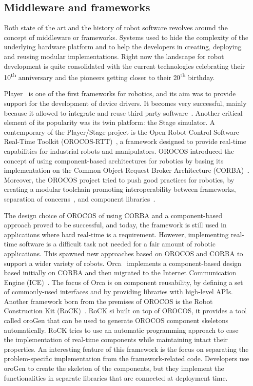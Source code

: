 \subsection{Middleware and frameworks}
Both state of the art and the history of robot software revolves around the concept of middleware or frameworks. Systems used to hide the complexity of the underlying hardware platform and to help the developers in creating, deploying and reusing modular implementations. Right now the landscape for robot development is quite consolidated with the current technologies celebrating their 10\textsuperscript{th} anniversary and the pioneers getting closer to their 20\textsuperscript{th} birthday.

Player~\cite{gerkey2003player} is one of the first frameworks for robotics, and its aim was to provide support for the development of device drivers. It becomes very successful, mainly because it allowed to integrate and reuse third party software~\cite{vaughan2007reusable}. Another critical element of its popularity was its twin platform: the Stage simulator. A contemporary of the Player/Stage project is the Open Robot Control Software Real-Time Toolkit (OROCOS-RTT)~\cite{bruyninckx2001open}, a framework designed to provide real-time capabilities for industrial robots and manipulators. OROCOS introduced the concept of using component-based architectures for robotics by basing its implementation on the Common Object Request Broker Architecture (CORBA)~\cite{otte1996understanding}. Moreover, the OROCOS project tried to push good practices for robotics, by creating a modular toolchain promoting interoperability between frameworks, separation of concerns~\cite{bruyninckx2003real}, and component libraries~\cite{bruyninckx2002orocos}.

The design choice of OROCOS of using CORBA and a component-based approach proved to be successful, and today, the framework is still used in applications where hard real-time is a requirement. However, implementing real-time software is a difficult task not needed for a fair amount of robotic applications. This spawned new approaches based on OROCOS and CORBA to support a wider variety of robots. Orca~\cite{brooks2007orca} implements a component-based design based initially on CORBA and then migrated to the Internet Communication Engine (ICE)~\cite{ICE}. The focus of Orca is on component reusability, by defining a set of commonly-used interfaces and by providing libraries with high-level APIs. Another framework born from the premises of OROCOS is the Robot Construction Kit (RoCK)~\cite{joyeux2011robot}. RoCK si built on top of OROCOS, it provides a tool called oroGen that can be used to generate OROCOS component skeletons automatically. RoCK tries to use an automatic programming approach to ease the implementation of real-time components while maintaining intact their properties. An interesting feature of this framework is the focus on separating the problem-specific implementation from the framework-related code. Developers use oroGen to create the skeleton of the components, but they implement the functionalities in separate libraries that are connected at deployment time.

